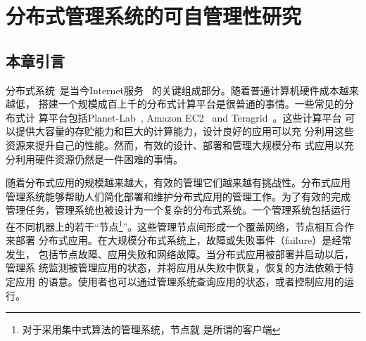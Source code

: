 \chapter{分布式管理系统的可自管理性研究}
\label{chap:selfman}


%
%
%
%
%
%
%
%
%
%
%
%

\section{本章引言}

分布式系统~\cite{gfs, bigtable, dynamo}是当今Internet服务~
\cite{google, amazon}的关键组成部分。随着普通计算机硬件成本越来越低，
搭建一个规模成百上千的分布式计算平台是很普通的事情。一些常见的分布式计
算平台包括Planet-Lab~\cite{Bavier2004}, Amazon
EC2~\cite{Garfinkel2007} and Teragrid~\cite{Catlett2002}。这些计算平台
可以提供大容量的存贮能力和巨大的计算能力，设计良好的应用可以充
分利用这些资源来提升自己的性能。然而，有效的设计、部署和管理大规模分布
式应用以充分利用硬件资源仍然是一件困难的事情。

随着分布式应用的规模越来越大，有效的管理它们越来越有挑战性。分布式应用
管理系统能够帮助人们简化部署和维护分布式应用的管理工作。为了有效的完成
管理任务，管理系统也被设计为一个复杂的分布式系统。一个管理系统包括运行
在不同机器上的若干“节点\footnote{对于采用集中式算法的管理系统，节点就
是所谓的客户端}”。这些管理节点间形成一个覆盖网络，节点相互合作来部署
分布式应用。在大规模分布式系统上，故障或失败事件（failure）是经常发生，
包括节点故障、应用失败和网络故障。当分布式应用被部署并启动以后，管理系
统监测被管理应用的状态，并将应用从失败中恢复，恢复的方法依赖于特定应用
的语意。使用者也可以通过管理系统查询应用的状态，或者控制应用的运行。

